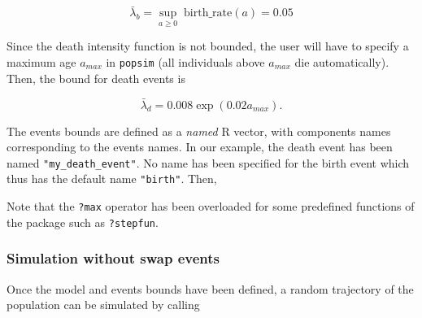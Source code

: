 \[\bar\lambda_b = \sup_{a\geq 0} \;  \text{birth\_rate}(a) = 0.05\]

Since the death intensity function is not bounded, the user will have to specify a maximum age \(a_{max}\) in \texttt{popsim} (all individuals above \(a_{max}\) die automatically). Then, the bound for death events is

\[ \bar \lambda_d = 0.008\exp(0.02 a_{max}).\]

The events bounds are defined as a \emph{named} R vector, with components names corresponding to the events names. In our example, the death event has been named \texttt{"my\_death\_event"}. No name has been specified for the birth event which thus has the default name \texttt{"birth"}. Then,

\begin{Shaded}
\begin{Highlighting}[]
\StringTok{ } 
\StringTok{ }\NormalTok{(}\NormalTok{ =}\StringTok{ }\OperatorTok{*}\NormalTok{(}\OperatorTok{*}
                  \NormalTok{ =}\StringTok{ }\OperatorTok{$}

\end{Highlighting}
\end{Shaded}

Note that the \texttt{?max} operator has been overloaded for some predefined functions of the package such as \texttt{?stepfun}.

\hypertarget{Simulation1}{%
\subsubsection{Simulation without swap events}\label{Simulation1}}

Once the model and events bounds have been defined, a random trajectory of the population can be simulated by calling

\begin{Shaded}
\begin{Highlighting}[]
\StringTok{ }
                   \NormalTok{)}
\end{Highlighting}
\end{Shaded}


